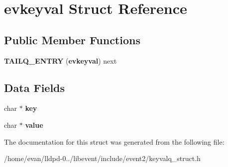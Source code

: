 \section{evkeyval \-Struct \-Reference}
\label{structevkeyval}
\subsection*{\-Public \-Member \-Functions}
\begin{DoxyCompactItemize}
\item 
{\bfseries \-T\-A\-I\-L\-Q\-\_\-\-E\-N\-T\-R\-Y} ({\bf evkeyval}) next\label{structevkeyval_af41dc97ce8804b3b05037749b2ad37dc}

\end{DoxyCompactItemize}
\subsection*{\-Data \-Fields}
\begin{DoxyCompactItemize}
\item 
char $\ast$ {\bfseries key}\label{structevkeyval_a5892a9181e6a332f84d27aecd41dcd12}

\item 
char $\ast$ {\bfseries value}\label{structevkeyval_a4e9aec275e566b978a3ccb4e043d8c61}

\end{DoxyCompactItemize}


\-The documentation for this struct was generated from the following file\-:\begin{DoxyCompactItemize}
\item 
/home/evan/lldpd-\/0../libevent/include/event2/keyvalq\-\_\-struct.\-h\end{DoxyCompactItemize}
